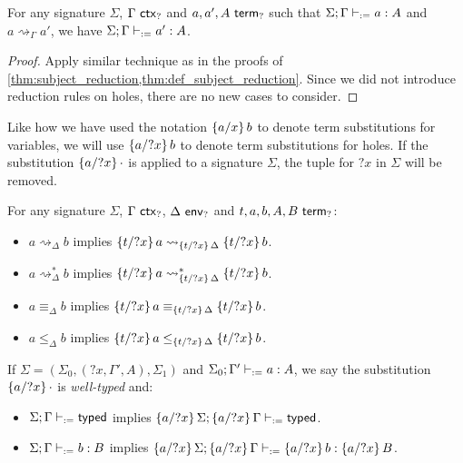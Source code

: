 \documentclass[twoside]{report}
\begin{document}
\begin{proposition}
    \label{thm:hole_subject_reduction}
    For any signature $\Sigma$, $\Gamma \ctxh$ and $a, a', A \termh$ such that $\Sigma; \Gamma \vdashd a : A$ and $a \rightsquigarrow_\Gamma a'$, we have $\Sigma; \Gamma \vdashd a' : A$.
\end{proposition}

\begin{proof}
    Apply similar technique as in the proofs of \cref{thm:subject_reduction,thm:def_subject_reduction}. Since we did not introduce reduction rules on holes, there are no new cases to consider.
\end{proof}

Like how we have used the notation $\subst x a b$ to denote term substitutions for variables, we will use $\subst {?x} a b$ to denote term substitutions for holes. If the substitution $\subst {?x} a \cdot$ is applied to a signature $\Sigma$, the tuple for ${?x}$ in $\Sigma$ will be removed.

\begin{proposition}
    \label{thm:hole_filling}
    For any signature $\Sigma$, $\Gamma \ctxh$, $\Delta \envh$ and $t, a, b, A, B \termh$:
    \begin{itemize}[noitemsep]
        \item $a \rightsquigarrow_\Delta b$ implies $\subst {?x} t a \rightsquigarrow_{\subst {?x} t \Delta} \subst {?x} t b$.
        \item $a \rightsquigarrow_\Delta^\ast b$ implies $\subst {?x} t a \rightsquigarrow_{\subst {?x} t \Delta}^\ast \subst {?x} t b$.
        \item $a \equiv_\Delta b$ implies $\subst {?x} t a \equiv_{\subst {?x} t \Delta} \subst {?x} t b$.
        \item $a \leq_\Delta b$ implies $\subst {?x} t a \leq_{\subst {?x} t \Delta} \subst {?x} t b$.
    \end{itemize}
    If $\Sigma = (\Sigma_0, ({?x}, \Gamma', A), \Sigma_1)$ and $\Sigma_0; \Gamma' \vdashd a : A$, we say the substitution $\subst {?x} a {\cdot}$ is \emph{well-typed} and:
    \begin{itemize}[noitemsep]
        \item $\Sigma; \Gamma \vdashd \ok$ implies $\subst {?x} a \Sigma; \subst {?x} a \Gamma \vdashd \ok$.
        \item $\Sigma; \Gamma \vdashd b : B$ implies $\subst {?x} a \Sigma; \subst {?x} a \Gamma \vdashd \subst {?x} a b : \subst {?x} a B$.
    \end{itemize}
\end{proposition}
\end{document}
